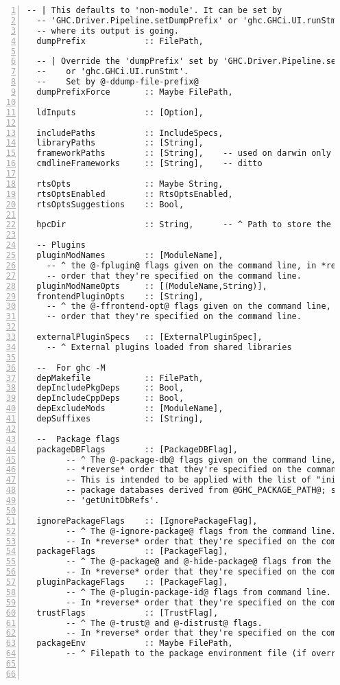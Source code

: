 \documentclass[en]{pracamgr}
\begin{document}
\begin{lstlisting}[numbers=left,stepnumber=1]
  -- | This defaults to 'non-module'. It can be set by
  -- 'GHC.Driver.Pipeline.setDumpPrefix' or 'ghc.GHCi.UI.runStmt' based on
  -- where its output is going.
  dumpPrefix            :: FilePath,

  -- | Override the 'dumpPrefix' set by 'GHC.Driver.Pipeline.setDumpPrefix'
  --    or 'ghc.GHCi.UI.runStmt'.
  --    Set by @-ddump-file-prefix@
  dumpPrefixForce       :: Maybe FilePath,

  ldInputs              :: [Option],

  includePaths          :: IncludeSpecs,
  libraryPaths          :: [String],
  frameworkPaths        :: [String],    -- used on darwin only
  cmdlineFrameworks     :: [String],    -- ditto

  rtsOpts               :: Maybe String,
  rtsOptsEnabled        :: RtsOptsEnabled,
  rtsOptsSuggestions    :: Bool,

  hpcDir                :: String,      -- ^ Path to store the .mix files

  -- Plugins
  pluginModNames        :: [ModuleName],
    -- ^ the @-fplugin@ flags given on the command line, in *reverse*
    -- order that they're specified on the command line.
  pluginModNameOpts     :: [(ModuleName,String)],
  frontendPluginOpts    :: [String],
    -- ^ the @-ffrontend-opt@ flags given on the command line, in *reverse*
    -- order that they're specified on the command line.

  externalPluginSpecs   :: [ExternalPluginSpec],
    -- ^ External plugins loaded from shared libraries

  --  For ghc -M
  depMakefile           :: FilePath,
  depIncludePkgDeps     :: Bool,
  depIncludeCppDeps     :: Bool,
  depExcludeMods        :: [ModuleName],
  depSuffixes           :: [String],

  --  Package flags
  packageDBFlags        :: [PackageDBFlag],
        -- ^ The @-package-db@ flags given on the command line, In
        -- *reverse* order that they're specified on the command line.
        -- This is intended to be applied with the list of "initial"
        -- package databases derived from @GHC_PACKAGE_PATH@; see
        -- 'getUnitDbRefs'.

  ignorePackageFlags    :: [IgnorePackageFlag],
        -- ^ The @-ignore-package@ flags from the command line.
        -- In *reverse* order that they're specified on the command line.
  packageFlags          :: [PackageFlag],
        -- ^ The @-package@ and @-hide-package@ flags from the command-line.
        -- In *reverse* order that they're specified on the command line.
  pluginPackageFlags    :: [PackageFlag],
        -- ^ The @-plugin-package-id@ flags from command line.
        -- In *reverse* order that they're specified on the command line.
  trustFlags            :: [TrustFlag],
        -- ^ The @-trust@ and @-distrust@ flags.
        -- In *reverse* order that they're specified on the command line.
  packageEnv            :: Maybe FilePath,
        -- ^ Filepath to the package environment file (if overriding default)



\end{lstlisting}
\end{document}
